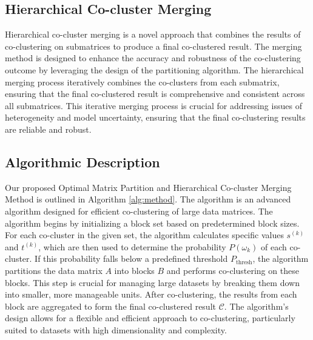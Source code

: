 \subsection{Hierarchical Co-cluster Merging}

Hierarchical co-cluster merging is a novel approach that combines the results of co-clustering on submatrices to produce a final co-clustered result.
The merging method is designed to enhance the accuracy and robustness of the co-clustering outcome by leveraging the design of the partitioning algorithm. The hierarchical merging process iteratively combines the co-clusters from each submatrix, ensuring that the final co-clustered result is comprehensive and consistent across all submatrices. This iterative merging process is crucial for addressing issues of heterogeneity and model uncertainty, ensuring that the final co-clustering results are reliable and robust.

\subsection{Algorithmic Description}
Our proposed  Optimal Matrix Partition and Hierarchical Co-cluster Merging Method is outlined in Algorithm \ref{alg:method}. The algorithm
is an advanced algorithm designed for efficient co-clustering of large data matrices. The algorithm begins by initializing a block set based on predetermined block sizes. For each co-cluster in the given set, the algorithm calculates specific values $s^{(k)}$ and $t^{(k)}$, which are then used to determine the probability $P(\omega_k)$ of each co-cluster. If this probability falls below a predefined threshold $P_{\text{thresh}}$, the algorithm partitions the data matrix $A$ into blocks $B$ and performs co-clustering on these blocks. This step is crucial for managing large datasets by breaking them down into smaller, more manageable units. After co-clustering, the results from each block are aggregated to form the final co-clustered result $\mathcal{C}$. The algorithm's design allows for a flexible and efficient approach to co-clustering, particularly suited to datasets with high dimensionality and complexity.
